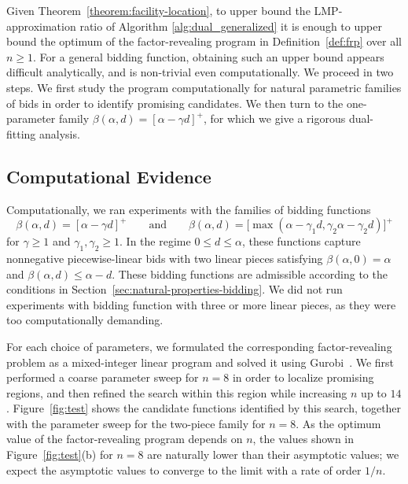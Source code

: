 Given Theorem~\ref{theorem:facility-location}, to upper bound the LMP-approximation ratio of Algorithm \ref{alg:dual_generalized} it is enough to upper bound the optimum of the factor-revealing program in Definition~\ref{def:frp} over all $n \geq 1$. For a general bidding function, obtaining such an upper bound appears difficult analytically, and is non-trivial even computationally.
We proceed in two steps.
We first study the program computationally for natural parametric families of bids in order to identify promising candidates.
We then turn to the one-parameter family $\beta(\alpha,d)=[\alpha-\gamma d]^+$, for which we give a rigorous dual-fitting analysis.


\subsection{Computational Evidence}


Computationally, we ran experiments with the families of bidding functions
\begin{equation*}
    \beta(\alpha,d) = [\alpha - \gamma d]^+
    \qquad\text{and}\qquad
    \beta(\alpha,d) = \bigl[\max(\alpha - \gamma_1 d,\gamma_2\alpha - \gamma_2 d)\bigr]^+
\end{equation*}
for $\gamma \geq 1$ and $\gamma_1, \gamma_2 \geq 1$.
In the regime $0 \le d \le \alpha$, these functions capture nonnegative piecewise-linear bids with two linear pieces satisfying $\beta(\alpha,0)=\alpha$ and $\beta(\alpha,d)\le \alpha-d$.
These bidding functions are admissible according to the conditions in Section~\ref{sec:natural-properties-bidding}.
We did not run experiments with bidding function with three or more linear pieces, as they were too computationally demanding.

For each choice of parameters, we formulated the corresponding factor-revealing problem as a mixed-integer linear program and solved it using Gurobi~\cite{gurobi}. We first performed a coarse parameter sweep for $n=8$ in order to localize promising regions, and then refined the search within this region while increasing $n$ up to $14$. Figure~\ref{fig:test} shows the candidate functions identified by this search, together with the parameter sweep for the two-piece family for $n=8$. As the optimum value of the factor-revealing program depends on $n$, the values shown in Figure~\ref{fig:test}(b) for $n=8$ are naturally lower than their asymptotic values; we expect the asymptotic values to converge to the limit with a rate of order $1/n$.

